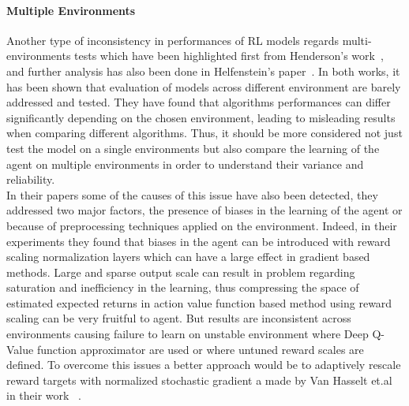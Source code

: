 \documentclass{article}
\begin{document}
\paragraph{Multiple Environments}
Another type of inconsistency in performances of RL models regards multi-environments tests which have been highlighted first from Henderson's work~\cite{DRL01}, and further analysis has also been done in Helfenstein's paper~\cite{BenchmarkingDRL}.  In both works, it has been shown that evaluation of models across different environment are barely addressed and tested. 
They have found that algorithms performances can differ significantly depending on the chosen environment, leading to misleading results when comparing different algorithms. Thus, it should be more considered not just test the model on a single environments but also compare the learning of the agent on multiple environments in order to understand their variance and reliability.\\
In their papers some of the causes of this issue have also been detected, they addressed two major factors, the presence of biases in the learning of the agent or because of preprocessing techniques applied on the environment. Indeed, in their experiments they found that biases in the agent can be introduced with reward scaling normalization layers which can have a large effect in gradient based methods. Large and sparse output scale can result in problem regarding saturation and inefficiency in the learning, thus compressing the space of estimated expected returns in action value function based method using reward scaling can be very fruitful to agent. But results are inconsistent across environments causing failure to learn on unstable environment where Deep Q-Value function approximator are used or where untuned reward scales are defined. To overcome this issues a better approach would be to adaptively rescale reward targets with normalized stochastic gradient a made by Van Hasselt et.al in their work ~\cite{VaHasselt}.
\end{document}
